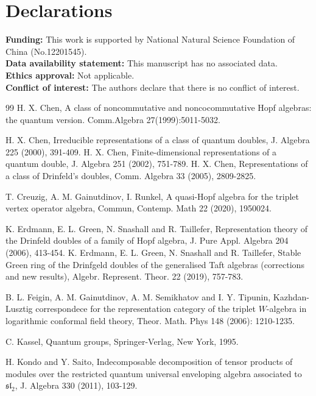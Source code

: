 \documentclass[10pt,oneside]{amsart}
\theoremstyle{definition}
\begin{document}
\section*{Declarations}
{\bf Funding:} This work is supported by National Natural Science  Foundation  of China (No.12201545).\\

{\bf Data availability statement:} This manuscript has no associated data.\\

{\bf Ethics approval:} Not applicable.\\

{\bf Conflict of interest:} The authors declare that there is no conflict of interest.


\begin{thebibliography}{99}
H. X. Chen, A class of noncommutative and noncocommutative Hopf algebras: the quantum version. Comm.Algebra 27(1999):5011-5032.

H. X. Chen, Irreducible representations of a class of quantum doubles,
{ J. Algebra 225} (2000), 391-409.
H. X. Chen, Finite-dimensional
representations of a quantum double, J. Algebra 251 (2002),
751-789.
H. X. Chen, Representations of a class of Drinfeld's doubles,
{ Comm. Algebra 33 }(2005), 2809-2825.

T. Creuzig, A. M. Gainutdinov, I. Runkel, A quasi-Hopf algebra for the triplet vertex operator algebra, Commun, Contemp. Math 22 (2020), 1950024.


K. Erdmann, E. L. Green, N. Snashall and R. Taillefer, Representation theory of the Drinfeld doubles of a family of Hopf algebra, J. Pure Appl. Algebra 204 (2006), 413-454.
K. Erdmann, E. L. Green, N. Snashall and R. Taillefer, Stable Green ring of the Drinfgeld doubles of the generalised Taft algebras (corrections and new results), Algebr. Represent. Theor. 22 (2019), 757-783.


B. L. Feigin, A. M. Gainutdinov, A. M. Semikhatov and I. Y. Tipunin, Kazhdan-Lusztig correspondece for the representation category of the triplet $W$-algebra in logarithmic conformal field theory, Theor. Math. Phys 148 (2006): 1210-1235.



C. Kassel, Quantum groups, Springer-Verlag, New York, 1995.

H. Kondo and Y. Saito, Indecomposable decomposition of tensor products of modules over the restricted
quantum universal enveloping algebra associated to $\mathfrak{sl}_2$,  J. Algebra 330 (2011), 103-129.


\end{thebibliography}
\end{document}
